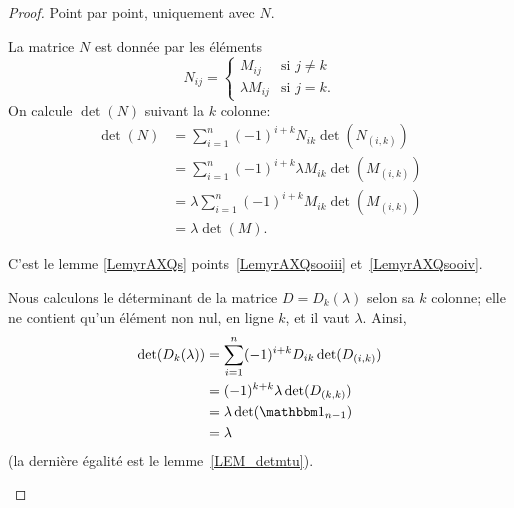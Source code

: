 \begin{proof}
    Point par point, uniquement avec \( N \).
    \begin{subproof}
        \item[\ref{ITEMooBKIGooCDQEDt}]
            La matrice \( N\) est donnée par les éléments
            \begin{equation}
                N_{ij}=\begin{cases}
                    M_{ij}    &   \text{si } j\neq k\\
                    \lambda M_{ij}    &    \text{si } j=k.
                \end{cases}
            \end{equation}
        On calcule \( \det(N) \) suivant la \( k\)\ieme{} colonne:
          \begin{subequations}
                  \begin{align}
                \det(N) &= \sum_{i = 1}^n (-1)^{i+k} N_{ik} \det(N_{(i,k)})\\
                &= \sum_{i = 1}^n (-1)^{i+k} \lambda M_{ik} \det(M_{(i,k)})\\
                &=  \lambda \sum_{i = 1}^n (-1)^{i+k} M_{ik} \det(M_{(i,k)})\\
                &= \lambda \det(M).
        \end{align}
          \end{subequations}            
            
        \item[\ref{ITEMooWRRCooFXkRNW}]
            C'est le lemme \ref{LemyrAXQs} points~\ref{LemyrAXQsooiii} et~\ref{LemyrAXQsooiv}.
        \item[\ref{ITEMooOGGDooPVVRzk}]
            Nous calculons le déterminant de la matrice \( D = D_k(\lambda) \) selon sa \( k \)\ieme{} colonne; elle ne contient qu'un élément non nul, en ligne \( k \), et il vaut \( \lambda \). Ainsi,
                    \begin{align}
                \det(D_k(\lambda)) &= \sum_{i = 1}^n (-1)^{i+k} D_{ik} \det(D_{(i,k)})\\
                &= (-1)^{k+k} \lambda \det(D_{(k,k)})\\
                &=  \lambda  \det(\mtu_{n-1})\\
                &= \lambda
        \end{align}
        (la dernière égalité est le lemme~\ref{LEM_detmtu}).
        

\end{subproof}
\end{proof}
